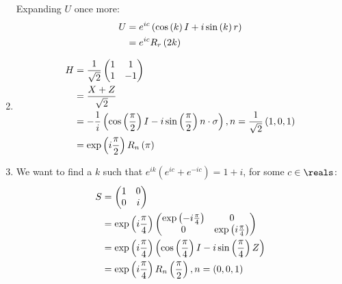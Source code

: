 \begin{enumerate}
%
Expanding $U$ once more:
%
\begin{align*}
U &= e^{ic} \left( \cos \left( k \right) I + i \sin \left( k \right) r \right) \\
&= e^{ic} R_r \left( 2k \right)
\end{align*}
%
\item \begin{align*}
H &= \frac{1}{\sqrt{2}} \begin{pmatrix} 1 & 1 \\ 1 & -1 \end{pmatrix} \\
&= \frac{X + Z}{\sqrt{2}} \\
&= -\frac1i \left( \cos \left( \frac{\pi}{2} \right) I - i \sin \left( \frac{\pi}{2} \right) n \cdot \sigma \right), n = \frac{1}{\sqrt{2}} \left( 1, 0, 1 \right) \\
&= \exp \left( i \frac{\pi}{2} \right) R_n \left( \pi \right)
\end{align*}
%
\item We want to find a $k$ such that $e^{ik} \left( e^{ic} + e^{-ic} \right) = 1 + i$, for some $c \in \reals$:
%
\begin{align*}
S &= \begin{pmatrix} 1 & 0 \\ 0 & i \end{pmatrix} \\
&= \exp \left( i \frac{\pi}{4} \right) \begin{pmatrix} \exp \left( -i \frac{\pi}{4} \right) & 0 \\ 0 & \exp \left( i \frac{\pi}{4} \right) \end{pmatrix} \\
&= \exp \left( i \frac{\pi}{4} \right) \left( \cos \left( \frac{\pi}{4} \right) I - i \sin \left( \frac{\pi}{4} \right) Z \right) \\
&= \exp \left( i \frac{\pi}{4} \right) R_n \left( \frac{\pi}{2} \right), n = \left(0, 0, 1 \right)
\end{align*}
\end{enumerate}
\endgroup
